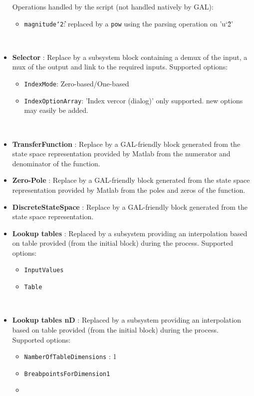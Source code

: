 \documentclass[a4paper,12pt]{article}
\begin{document}
\begin{itemize}
	Operations handled by the script (not handled natively by GAL):
	\begin{itemize}
	\item
	\texttt{magnitude\char`\^2}: replaced by a \texttt{pow} using the parsing operation on 'u\char`\^ 2'
	\end{itemize}
	~
\item
\textbf{Selector} : Replace by a subsystem block containing a demux of the input, a mux of the output and link to the required inputs. \newline
	Supported options:
	\begin{itemize}
	\item
	\texttt{IndexMode}: Zero-based/One-based
	\item
	\texttt{IndexOptionArray}: 'Index vercor (dialog)' only supported. \newline
	new options may easily be added.
	\end{itemize}
	~
\item
\textbf{TransferFunction} : Replace by a GAL-friendly block generated from the state space representation provided by Matlab from the numerator and denominator of the function.
~\\
\item
\textbf{Zero-Pole} : Replace by a GAL-friendly block generated from the state space representation provided by Matlab from the poles and zeros of the function.
~\\
\item
\textbf{DiscreteStateSpace} : Replace by a GAL-friendly block generated from the state space representation.
~\\
\item
\textbf{Lookup tables} : Replaced by a subsystem providing an interpolation based on table provided (from the initial block) during the process.
	Supported options:
	\begin{itemize}
	\item
	\texttt{InputValues}
	\item
	\texttt{Table}
	\end{itemize}
	~
\item
\textbf{Lookup tables nD} : Replaced by a subsystem providing an interpolation based on table provided (from the initial block) during the process.
	Supported options:
	\begin{itemize}
	\item
	\texttt{NamberOfTableDimensions} : 1
	\item
	\texttt{BreabpointsForDimension1}
	\item

\end{itemize}
\end{itemize}
\end{document}
